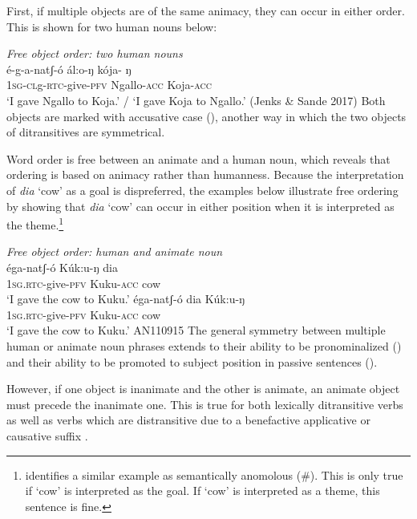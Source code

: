 First, if multiple objects are of the same animacy, they can occur in either order. This is shown for two human nouns below:

\ea \textit{Free object order: two human nouns}\\
\gll  \'e-g-a-natʃ-\'o \'al:o-ŋ k\'oja-
ŋ\\
\textsc{1sg-cl}g-\textsc{rtc}-give-\textsc{pfv} Ngallo-\textsc{acc} Koja-\textsc{acc}\\
\glt `I gave Ngallo to Koja.' / `I gave Koja to Ngallo.'  \hfill (Jenks \& Sande 2017)
\z 
Both objects are marked with accusative case (), another way in which the two objects of ditransitives are symmetrical.

Word order is free between an animate and a human noun, which reveals that ordering is based on animacy rather than humanness. Because the interpretation of \textit{dia} `cow' as a goal is dispreferred, the examples below illustrate free ordering by showing that \textit{dia} `cow' can occur in either position when it is interpreted as the theme.\footnote{\citet[][p. 41, ex. 68b]{Ackerman:2015} identifies a similar example as semantically anomolous (\#). This is only true if `cow' is interpreted as the goal. If `cow' is interpreted as a theme, this sentence is fine.}

\ea \textit{Free object order: human and animate noun}\\
\ea \gll  \'ega-natʃ-\'o K\'uk:u-ŋ dia\\
\textsc{1sg.rtc}-give-\textsc{pfv} Kuku-\textsc{acc} cow\\
\glt `I gave the cow to Kuku.' 
\ex \gll  \'ega-natʃ-\'o dia K\'uk:u-ŋ\\
\textsc{1sg.rtc}-give-\textsc{pfv} Kuku-\textsc{acc} cow\\
\glt `I gave the cow to Kuku.' \hfill AN110915 \z
\z
The general symmetry between multiple human or animate noun phrases extends to their ability to be pronominalized () and their ability to be promoted to subject position in passive sentences ().

However, if one object is inanimate and the other is animate, an animate object must precede the inanimate one. This is true for both lexically ditransitive verbs  as well as verbs which are distransitive due to a benefactive applicative  or causative suffix .

